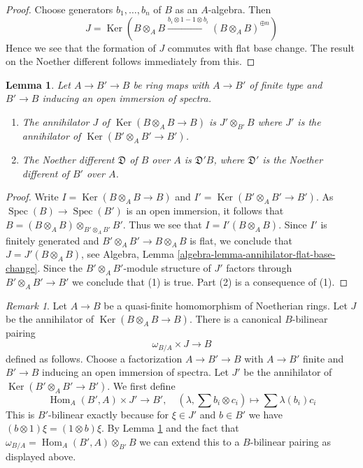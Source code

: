 \documentclass{stacks-project}
\theoremstyle{plain}
\newtheorem{lemma}[subsection]{Lemma}
\theoremstyle{definition}
\theoremstyle{remark}
\newtheorem{remark}[subsection]{Remark}
\numberwithin{equation}{subsection}
\def\Spec{\mathop{\mathrm{Spec}}}
\def\Hom{\mathop{\mathrm{Hom}}\nolimits}
\def\Ker{\mathop{\mathrm{Ker}}}
\begin{document}
\begin{proof}
Choose generators $b_1, \ldots, b_n$ of $B$ as an $A$-algebra.
Then
$$
J = \Ker(B \otimes_A B \xrightarrow{b_i \otimes 1 - 1 \otimes b_i}
(B \otimes_A B)^{\oplus n})
$$
Hence we see that the formation of $J$ commutes with flat base change.
The result on the Noether different follows immediately from this.
\end{proof}

\begin{lemma}
\label{lemma-noether-different-localization}
Let $A \to B' \to B$ be ring maps with $A \to B'$
of finite type and $B' \to B$ inducing an open immersion of spectra.
\begin{enumerate}
\item The annihilator $J$ of $\Ker(B \otimes_A B \to B)$ is
$J' \otimes_{B'} B$ where $J'$ is the annihilator of
$\Ker(B' \otimes_A B' \to B')$.
\item The Noether different $\mathfrak{D}$ of $B$ over $A$ is
$\mathfrak{D}'B$, where $\mathfrak{D}'$ is
the Noether different of $B'$ over $A$.
\end{enumerate}
\end{lemma}

\begin{proof}
Write $I = \Ker(B \otimes_A B \to B)$ and $I' = \Ker(B' \otimes_A B' \to B')$.
As $\Spec(B) \to \Spec(B')$ is an open immersion, it follows that
$B = (B \otimes_A B) \otimes_{B' \otimes_A B'} B'$. Thus we see that
$I = I'(B \otimes_A B)$. Since $I'$ is finitely generated and
$B' \otimes_A B' \to B \otimes_A B$ is flat, we conclude that
$J = J'(B \otimes_A B)$, see
Algebra, Lemma \ref{algebra-lemma-annihilator-flat-base-change}.
Since the $B' \otimes_A B'$-module structure of $J'$
factors through $B' \otimes_A B' \to B'$ we conclude that (1) is true.
Part (2) is a consequence of (1).
\end{proof}

\begin{remark}
\label{remark-construction-pairing}
Let $A \to B$ be a quasi-finite homomorphism of Noetherian rings.
Let $J$ be the annihilator of $\Ker(B \otimes_A B \to B)$.
There is a canonical $B$-bilinear pairing
\begin{equation}
\label{equation-pairing-noether}
\omega_{B/A} \times J \longrightarrow B
\end{equation}
defined as follows. Choose a factorization $A \to B' \to B$
with $A \to B'$ finite and $B' \to B$ inducing an open immersion
of spectra. Let $J'$ be the annihilator of $\Ker(B' \otimes_A B' \to B')$.
We first define
$$
\Hom_A(B', A) \times J' \longrightarrow B',\quad
(\lambda, \sum b_i \otimes c_i) \longmapsto \sum \lambda(b_i)c_i
$$
This is $B'$-bilinear exactly because for $\xi \in J'$ and $b \in B'$
we have $(b \otimes 1)\xi = (1 \otimes b)\xi$. By
Lemma \ref{lemma-noether-different-localization}
and the fact that $\omega_{B/A} = \Hom_A(B', A) \otimes_{B'} B$
we can extend this to a $B$-bilinear pairing as displayed above.
\end{remark}
\end{document}
